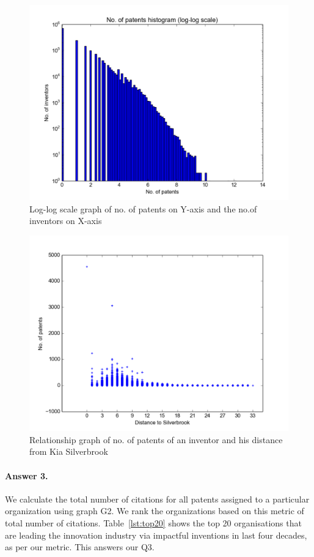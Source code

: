 \begin{figure}
  \includegraphics[scale=0.425]{figure/silver_log_log.pdf}
  \caption{ Log-log scale graph of no. of patents on Y-axis and the no.of inventors on X-axis}
\label{fig:patent}	
\end{figure}

\begin{figure}[t]
  \includegraphics[scale=0.425]{figure/distance_patents.pdf}
  \caption{Relationship graph of no. of patents of an inventor and his distance from Kia Silverbrook}
\label{fig:distance_patent}
\end{figure}

\paragraph{Answer 3.}
We calculate the total number of citations for all patents assigned to a particular organization using graph G2. We rank the organizations based on this metric of total number of citations. Table~\ref{lst:top20} shows the top 20 organisations that are leading the innovation industry via impactful inventions in last four decades, as per our metric. 
This answers our Q3. 

